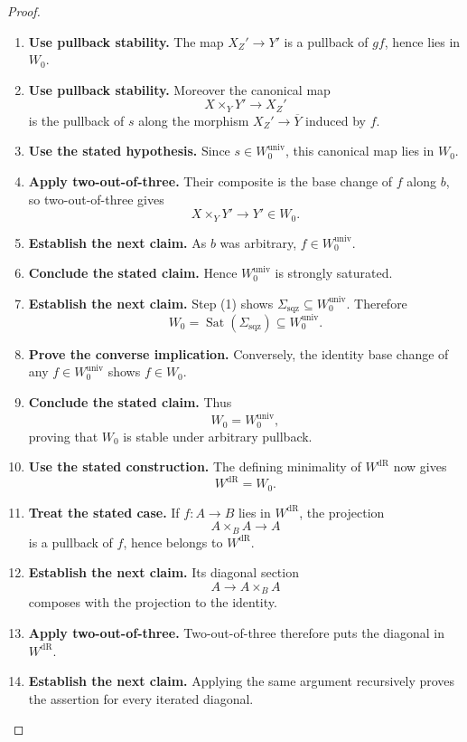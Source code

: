 \begin{proof}
\begin{enumerate}[label=\textup{(\arabic*)}]
    Now put
    \[
    X_Z':=X\times_ZY'.
    \]
    \item \textbf{Use pullback stability.}
    The map \(X_Z'\to Y'\) is a pullback of \(gf\), hence lies in \(W_0\).
    \item \textbf{Use pullback stability.}
    Moreover the canonical map
    \[
    X\times_YY'\longrightarrow X_Z'
    \]
    is the pullback of \(s\) along the morphism
    \(X_Z'\to\overline Y\) induced by \(f\).
    \item \textbf{Use the stated hypothesis.}
    Since
    \(s\in W_0^{\mathrm{univ}}\), this canonical map lies in \(W_0\).
    \item \textbf{Apply two-out-of-three.}
    Their
    composite is the base change of \(f\) along \(b\), so two-out-of-three gives
    \[
    X\times_YY'\longrightarrow Y'\in W_0.
    \]
    \item \textbf{Establish the next claim.}
    As \(b\) was arbitrary, \(f\in W_0^{\mathrm{univ}}\).
    \item \textbf{Conclude the stated claim.}
    Hence
    \(W_0^{\mathrm{univ}}\) is strongly saturated.
    \item \textbf{Establish the next claim.}
    Step \textup{(1)} shows
    \(\Sigma_{\mathrm{sqz}}\subseteq W_0^{\mathrm{univ}}\).
    Therefore
    \[
    W_0=\operatorname{Sat}(\Sigma_{\mathrm{sqz}})
    \subseteq W_0^{\mathrm{univ}}.
    \]
    \item \textbf{Prove the converse implication.}
    Conversely, the identity base change of any
    \(f\in W_0^{\mathrm{univ}}\) shows \(f\in W_0\).
    \item \textbf{Conclude the stated claim.}
    Thus
    \[
    W_0=W_0^{\mathrm{univ}},
    \]
    proving that \(W_0\) is stable under arbitrary pullback.
    \item \textbf{Use the stated construction.}
    The defining
    minimality of \(W^{\mathrm{dR}}\) now gives
    \[
    W^{\mathrm{dR}}
    =
    W_0.
    \]
    \item \textbf{Treat the stated case.}
    If \(f:A\to B\) lies in \(W^{\mathrm{dR}}\), the projection
    \[
    A\times_BA\longrightarrow A
    \]
    is a pullback of \(f\), hence belongs to \(W^{\mathrm{dR}}\).
    \item \textbf{Establish the next claim.}
    Its diagonal
    section
    \[
    A\longrightarrow A\times_BA
    \]
    composes with the projection to the identity.
    \item \textbf{Apply two-out-of-three.}
    Two-out-of-three therefore puts
    the diagonal in \(W^{\mathrm{dR}}\).
    \item \textbf{Establish the next claim.}
    Applying the same argument recursively
    proves the assertion for every iterated diagonal.
\end{enumerate}
\end{proof}

